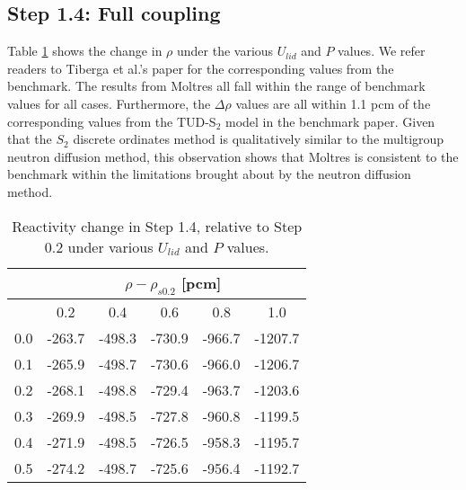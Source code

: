 \subsection{Step 1.4: Full coupling}

Table \ref{table:full} shows the change in $\rho$ under the various $U_{lid}$
and $P$ values. We refer readers to Tiberga et al.'s paper
\cite{tiberga_results_2020} for the corresponding values from the benchmark.
The results from Moltres all fall within the range of benchmark values for all
cases. Furthermore, the $\Delta\rho$ values are all within 1.1 pcm of the
corresponding values from the TUD-S$_2$ model in the benchmark paper. Given
that the $S_2$ discrete ordinates method is qualitatively similar to the
multigroup neutron diffusion method, this observation shows that Moltres is
consistent to the benchmark within the limitations brought about by the neutron
diffusion method.

\begin{table}[htbp!]
	\caption{Reactivity change in Step 1.4, relative to Step 0.2 under various
	$U_{lid}$ and $P$ values.}
	\centering
	\small
	\setlength\tabcolsep{1.5pt}
	\begin{tabular}{c c c c c c}
		\toprule
		& \multicolumn{5}{c}{$\rho - \rho_{s0.2}$ [pcm]} \\
		\midrule
		{\backslashbox{$U_{lid}$ [m$\cdot$s$^{-1}$]}{$P$ [GW]}} & 0.2 & 0.4 & 0.6 & 0.8 & 1.0 \\
		\midrule
		0.0 & -263.7 & -498.3 & -730.9 & -966.7 & -1207.7 \\
		0.1 & -265.9 & -498.7 & -730.6 & -966.0 & -1206.7 \\
		0.2 & -268.1 & -498.8 & -729.4 & -963.7 & -1203.6 \\
		0.3 & -269.9 & -498.5 & -727.8 & -960.8 & -1199.5 \\
		0.4 & -271.9 & -498.5 & -726.5 & -958.3 & -1195.7 \\
		0.5 & -274.2 & -498.7 & -725.6 & -956.4 & -1192.7 \\
		\bottomrule
	\end{tabular}
	\label{table:full}
\end{table}
